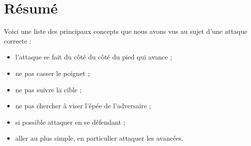 \section{Résumé}


\noindent
Voici une liste des principaux concepts que nous avons vus au sujet d'une attaque correcte :
\begin{itemize}
	\item l'attaque se fait du côté du côté du pied qui avance ;
	\item ne pas casser le poignet ;
	\item ne pas suivre la cible ;
	\item ne pas chercher à viser l'épée de l'adversaire ;
	\item si possible attaquer en se défendant ;
	\item aller au plus simple, en particulier attaquer les avancées.
\end{itemize}

